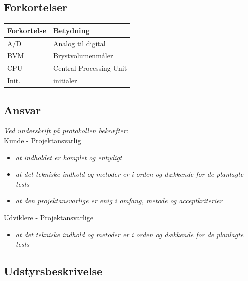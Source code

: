 		\subsection{Forkortelser}
		\vspace{1cm}
\begin{table}[hbt]
\centering
\label{ordliste}
\begin{tabular}{|l|l|}
\hline
\textbf{Forkortelse             } & \textbf{Betydning             } \\ \hline
A/D & Analog til digital \\ \hline
BVM & Brystvolumenmåler \\ \hline
CPU & Central Processing Unit \\ \hline
Init. & initialer \\ \hline
\end{tabular}
\end{table}
		  
		\subsection{Ansvar}
		\textit{		Ved underskrift på protokollen bekræfter: }\\
		
		Kunde - Projektansvarlig
		\begin{itemize}
			\item \textit{at indholdet er komplet og entydigt}
			\item \textit{at det tekniske indhold og metoder er i orden og dækkende for de planlagte tests}
			\item \textit{at den projektansvarlige er enig i omfang, metode og acceptkriterier}
		\end{itemize}
		
		Udviklere - Projektansvarlige
		\begin{itemize}
			\item \textit{at det tekniske indhold og metoder er i orden og dækkende for de planlagte tests}
		\end{itemize}
		
		\subsection{Udstyrsbeskrivelse}
	
